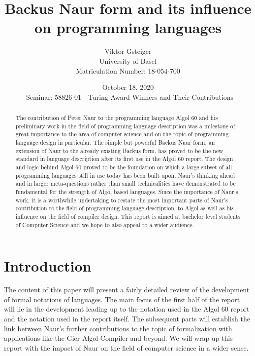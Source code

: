 \documentclass{article}
\author{Viktor Gsteiger \\ University of Basel \\ Matriculation Number: 18-054-700}
\title{Backus Naur form and its influence on programming languages}
\date{October 18, 2020 \\\ Seminar: 58826-01 - Turing Award Winners and Their Contributions}
\begin{document}
\maketitle

\begin{abstract}
	The contribution of Peter Naur to the programming language Algol 60 and his preliminary work in the field of programming language description was a milestone of great importance to the area of computer science and on the topic of programming language design in particular. The simple but powerful Backus Naur form, an extension of Naur to the already existing Backus form, has proved to be the new standard in language description after its first use in the Algol 60 report. The design and logic behind Algol 60 proved to be the foundation on which a large subset of all programming languages still in use today has been built upon. Naur’s thinking ahead and in larger meta-questions rather than small technicalities have demonstrated to be fundamental for the strength of Algol based languages. Since the importance of Naur’s work, it is a worthwhile undertaking to restate the most important parts of Naur’s contribution to the field of programming language description, to Algol as well as his influence on the field of compiler design. This report is aimed at bachelor level students of Computer Science and we hope to also appeal to a wider audience.
\end{abstract}

\newpage

\section{Introduction}
The content of this paper will present a fairly detailed review of the development of formal notations of languages. The main focus of the first half of the report will lie in the development leading up to the notation used in the Algol 60 report and the notation used in the report itself. The subsequent parts will establish the link between Naur's further contributions to the topic of formalization with applications like the Gier Algol Compiler and beyond. We will wrap up this report with the impact of Naur on the field of computer science in a wider sense.
\end{document}
